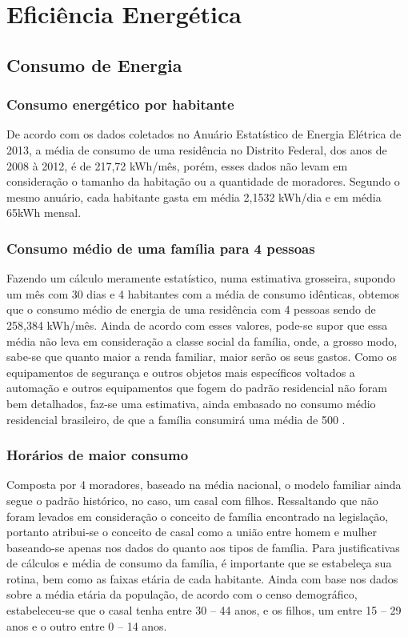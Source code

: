 \chapter{Eficiência Energética}
\section{Consumo de Energia}

\subsection{Consumo energético por habitante}

	De acordo com os dados coletados no Anuário Estatístico de Energia Elétrica de 2013, a média de consumo de uma residência no Distrito Federal, dos anos de 2008 à 2012, é de 217,72 kWh/mês, porém, esses dados não levam em consideração o tamanho da habitação ou a quantidade de moradores. Segundo o mesmo anuário, cada habitante gasta em média 2,1532 kWh/dia e em média 65kWh mensal\cite{2013Aneel}.

\subsection{Consumo médio de uma família para 4 pessoas}

	Fazendo um cálculo meramente estatístico, numa estimativa grosseira, supondo um mês com 30 dias e 4 habitantes com a média de consumo idênticas, obtemos que o consumo médio de energia de uma residência com 4 pessoas sendo de 258,384 kWh/mês. Ainda de acordo com esses valores, pode-se supor que essa média não leva em consideração a classe social da família, onde, a grosso modo, sabe-se que quanto maior a renda familiar, maior serão os seus gastos. Como os equipamentos de segurança e outros objetos mais específicos voltados a automação e outros equipamentos que fogem do padrão residencial não foram bem detalhados, faz-se uma estimativa, ainda embasado no consumo médio residencial brasileiro, de que a família consumirá uma média de 500 .

\subsection{Horários de maior consumo}

	Composta por 4 moradores, baseado na média nacional, o modelo familiar ainda segue o padrão histórico, no caso, um casal com filhos. Ressaltando que não foram levados em consideração o conceito de família encontrado na legislação, portanto atribui-se o conceito de casal como a união entre homem e mulher baseando-se apenas nos dados do \cite{IBGE} quanto aos tipos de família. Para justificativas de cálculos e média de consumo da família, é importante que se estabeleça sua rotina, bem como as faixas etária de cada habitante. Ainda com base nos dados sobre a média etária da população, de acordo com o censo demográfico, estabeleceu-se que o casal tenha entre 30 – 44 anos, e os filhos, um entre 15 – 29 anos e o outro entre 0 – 14 anos.

